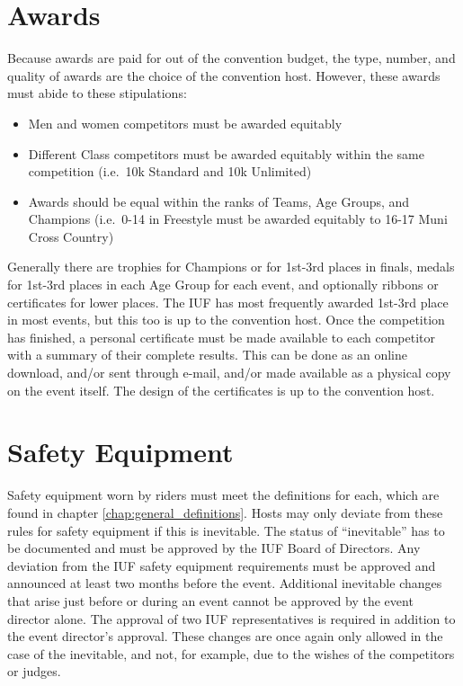 \section{Awards}

Because awards are paid for out of the convention budget, the type, number, and quality of awards are the choice of the convention host.
However, these awards must abide to these stipulations:
\begin{itemize}
  \item Men and women competitors must be awarded equitably
  \item Different Class competitors must be awarded equitably within the same competition (i.e.\ 10k Standard and 10k Unlimited)
  \item Awards should be equal within the ranks of Teams, Age Groups, and Champions (i.e.\ 0-14 in Freestyle must be awarded equitably to 16-17 Muni Cross Country)
\end{itemize}

Generally there are trophies for Champions or for 1st-3rd places in finals, medals for 1st-3rd places in each Age Group for each event, and optionally ribbons or certificates for lower places.
The IUF has most frequently awarded 1st-3rd place in most events, but this too is up to the convention host.
Once the competition has finished, a personal certificate must be made available to each competitor with a summary of their complete results.
This can be done as an online download, and/or sent through e-mail, and/or made available as a physical copy on the event itself.
The design of the certificates is up to the convention host.

\section{Safety Equipment}

Safety equipment worn by riders must meet the definitions for each, which are found in chapter \ref{chap:general_definitions}.
Hosts may only deviate from these rules for safety equipment if this is inevitable.
The status of ``inevitable'' has to be documented and must be approved by the IUF Board of Directors.
Any deviation from the IUF safety equipment requirements must be approved and announced at least two months before the event.
Additional inevitable changes that arise just before or during an event cannot be approved by the event director alone.
The approval of two IUF representatives is required in addition to the event director's approval.
These changes are once again only allowed in the case of the inevitable, and not, for example, due to the wishes of the competitors or judges.

